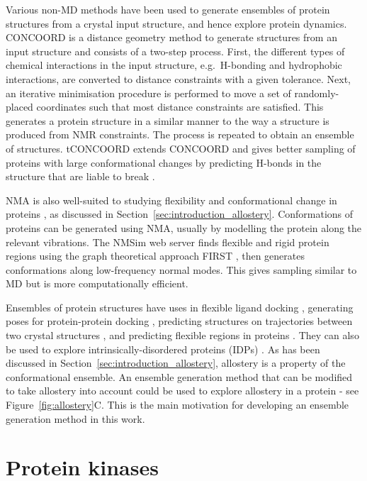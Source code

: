 Various non-MD methods have been used to generate ensembles of protein structures from a crystal input structure, and hence explore protein dynamics.
CONCOORD \cite{DeGroot1997, DeGroot1999} is a distance geometry method to generate structures from an input structure and consists of a two-step process.
First, the different types of chemical interactions in the input structure, e.g.\ H-bonding and hydrophobic interactions, are converted to distance constraints with a given tolerance.
Next, an iterative minimisation procedure is performed to move a set of randomly-placed coordinates such that most distance constraints are satisfied.
This generates a protein structure in a similar manner to the way a structure is produced from NMR constraints.
The process is repeated to obtain an ensemble of structures.
tCONCOORD extends CONCOORD and gives better sampling of proteins with large conformational changes by predicting H-bonds in the structure that are liable to break \cite{Seeliger2007}.

NMA is also well-suited to studying flexibility and conformational change in proteins \cite{Dobbins2008}, as discussed in Section~\ref{sec:introduction_allostery}.
Conformations of proteins can be generated using NMA, usually by modelling the protein along the relevant vibrations.
The NMSim web server \cite{Kruger2012, Ahmed2011} finds flexible and rigid protein regions using the graph theoretical approach FIRST \cite{Jacobs2001}, then generates conformations along low-frequency normal modes.
This gives sampling similar to MD but is more computationally efficient.

Ensembles of protein structures have uses in flexible ligand docking \cite{Totrov2008}, generating poses for protein-protein docking \cite{Mustard2005}, predicting structures on trajectories between two crystal structures \cite{Weiss2009}, and predicting flexible regions in proteins \cite{Ahmed2011}.
They can also be used to explore intrinsically-disordered proteins (IDPs) \cite{Tompa2012, Best2017}.
As has been discussed in Section~\ref{sec:introduction_allostery}, allostery is a property of the conformational ensemble.
An ensemble generation method that can be modified to take allostery into account could be used to explore allostery in a protein - see Figure~\ref{fig:allostery}C.
This is the main motivation for developing an ensemble generation method in this work.


\section{Protein kinases}
\label{sec:introduction_kinases}

